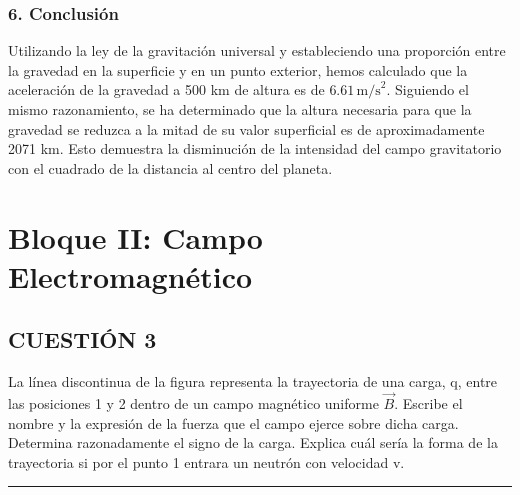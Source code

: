 \subsubsection*{6. Conclusión}
\begin{cajaconclusion}
Utilizando la ley de la gravitación universal y estableciendo una proporción entre la gravedad en la superficie y en un punto exterior, hemos calculado que la aceleración de la gravedad a 500 km de altura es de $6.61 \, \text{m/s}^2$. Siguiendo el mismo razonamiento, se ha determinado que la altura necesaria para que la gravedad se reduzca a la mitad de su valor superficial es de aproximadamente 2071 km. Esto demuestra la disminución de la intensidad del campo gravitatorio con el cuadrado de la distancia al centro del planeta.
\end{cajaconclusion}

\newpage
\section{Bloque II: Campo Electromagnético}
\label{sec:em_2024_jun_ord}

\subsection{CUESTIÓN 3}
\label{subsec:C3_2024_jun_ord}

\begin{cajaenunciado}
La línea discontinua de la figura representa la trayectoria de una carga, q, entre las posiciones 1 y 2 dentro de un campo magnético uniforme $\vec{B}$. Escribe el nombre y la expresión de la fuerza que el campo ejerce sobre dicha carga. Determina razonadamente el signo de la carga. Explica cuál sería la forma de la trayectoria si por el punto 1 entrara un neutrón con velocidad v.
\end{cajaenunciado}
\hrule

